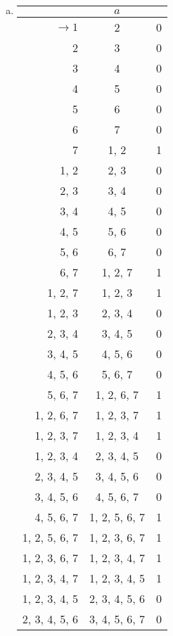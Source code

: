 \begin{solution}\mbox{\\}
\begin{enumerate}[(a)]
    \item\begin{tabular}[t]{r c r}
         & \(a\) & \\\bottomrule
            \(\to1\) & 2 & 0 \\
            2 & 3 & 0 \\
            3 & 4 & 0\\
            4 & 5 & 0\\
            5 & 6 & 0\\
            6 & 7 & 0\\
            7 & 1, 2 & 1\\
            1, 2 & 2, 3 & 0\\
            2, 3 & 3, 4 & 0\\
            3, 4 & 4, 5 & 0\\
            4, 5 & 5, 6 & 0\\
            5, 6 & 6, 7 & 0\\
            6, 7 & 1, 2, 7 & 1\\
            1, 2, 7 & 1, 2, 3 & 1\\
            1, 2, 3 & 2, 3, 4 & 0\\
            2, 3, 4 & 3, 4, 5 & 0\\
            3, 4, 5 & 4, 5, 6 & 0\\
            4, 5, 6 & 5, 6, 7 & 0\\
            5, 6, 7 & 1, 2, 6, 7 & 1\\
            1, 2, 6, 7 & 1, 2, 3, 7 & 1\\
            1, 2, 3, 7 & 1, 2, 3, 4 & 1\\
            1, 2, 3, 4 & 2, 3, 4, 5 & 0\\
            2, 3, 4, 5 & 3, 4, 5, 6 & 0\\
            3, 4, 5, 6 & 4, 5, 6, 7 & 0\\
            4, 5, 6, 7 & 1, 2, 5, 6, 7 & 1\\
            1, 2, 5, 6, 7 & 1, 2, 3, 6, 7 & 1\\
            1, 2, 3, 6, 7 & 1, 2, 3, 4, 7 & 1\\
            1, 2, 3, 4, 7 & 1, 2, 3, 4, 5 & 1\\
            1, 2, 3, 4, 5 & 2, 3, 4, 5, 6 & 0\\
            2, 3, 4, 5, 6 & 3, 4, 5, 6, 7 & 0\\

\end{tabular}
\end{enumerate}
\end{solution}

